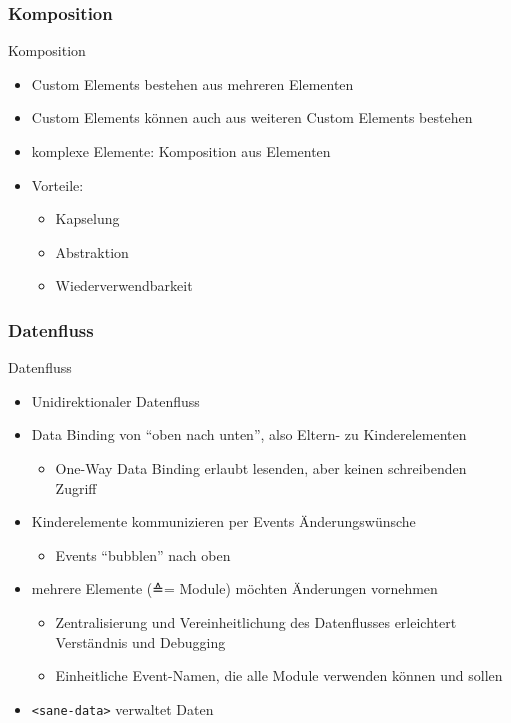 \documentclass{beamer}
\begin{document}
\subsubsection{Komposition}
\begin{frame}{Komposition}
	\begin{itemize}
		\item Custom Elements bestehen aus mehreren Elementen
		\item Custom Elements können auch aus weiteren Custom Elements bestehen
		\item komplexe Elemente: Komposition aus Elementen
		\item Vorteile:
			\begin{itemize}
				\item Kapselung
				\item Abstraktion
				\item Wiederverwendbarkeit
			\end{itemize}
	\end{itemize}
\end{frame}

\subsubsection{Datenfluss}
\begin{frame}{Datenfluss}
	\begin{itemize}
		\item Unidirektionaler Datenfluss
		\item Data Binding von \enquote{oben nach unten}, also Eltern- zu Kinderelementen
			\begin{itemize}
				\item One-Way Data Binding erlaubt lesenden, aber keinen schreibenden Zugriff
			\end{itemize}
		\item Kinderelemente kommunizieren per Events Änderungswünsche
			\begin{itemize}
				\item Events \enquote{bubblen} nach oben
			\end{itemize}
		\item mehrere Elemente (≙= Module) möchten Änderungen vornehmen
			\begin{itemize}
				\item Zentralisierung und Vereinheitlichung des Datenflusses erleichtert Verständnis und Debugging
				\item Einheitliche Event-Namen, die alle Module verwenden können und sollen
			\end{itemize}
		\item \texttt{<sane-data>} verwaltet Daten
	\end{itemize}
\end{frame}
\end{document}
